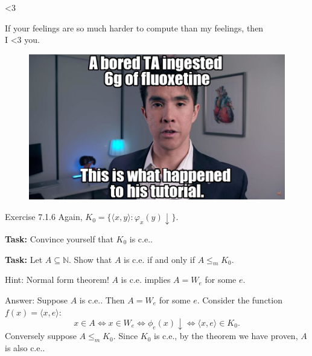 \documentclass{beamer}
\begin{document}
\begin{frame}{\textless 3}
\begin{theorem}
\color{red}
If your feelings are so much harder to compute than my feelings, then\\ I \textless 3 you.
\end{theorem}

\begin{figure}[h]
\centering
\includegraphics[scale=0.3]{img/chubbyemu.png}
\end{figure}

\end{frame}

\begin{frame}{Exercise 7.1.6}
Again, $K_0 = \{\langle x, y \rangle: \varphi_x(y) \downarrow\}$.
\vspace{2mm}

\textbf{Task:} Convince yourself that $K_0$ is c.e..

\vspace{2mm}

\textbf{Task:} Let $A \subseteq \mathbb N$. Show that $A$ is c.e. if and only if $A \leq_m K_0$. 

\vspace{2mm}

Hint: Normal form theorem! $A$ is c.e. implies $A = W_e$ for some $e$. 

\vspace{2mm}

\pause
Answer: Suppose $A$ is c.e.. Then $A = W_e$ for some $e$. Consider the function $f(x) = \langle x, e \rangle$: 
$$x \in A \Leftrightarrow x \in W_e \Leftrightarrow \phi_e(x) \downarrow \Leftrightarrow \langle x, e \rangle \in K_0.$$
Conversely suppose $A \leq_m K_0$. Since $K_0$ is c.e., by the theorem we have proven, $A$ is also c.e..

\end{frame}
\end{document}
